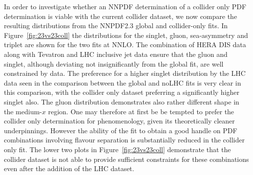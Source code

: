 In order to investigate whether an NNPDF determination of a collider only PDF determination is viable with the current collider dataset, we now compare the resulting distributions from the NNPDF2.3 global and collider-only fits. In Figure~\ref{fig:23vs23coll} the distributions for the singlet, gluon, sea-asymmetry and triplet are shown for the two fits at NNLO. The combination of HERA DIS data along with Tevatron and LHC inclusive jet data ensure that the gluon and singlet, although deviating not insignificantly from the global fit, are well constrained by data. The preference for a higher singlet distribution by the LHC data seen in the comparison between the global and noLHC fits is very clear in this comparison, with the collider only dataset preferring a significantly higher singlet also. The gluon distribution demonstrates also rather different shape in the medium-$x$ region. One may therefore at first be be tempted to prefer the collider only determination for phenomenology, given its theoretically cleaner underpinnings. However the ability of the fit to obtain a good handle on PDF combinations involving flavour separation is substantially reduced in the collider only fit. The lower two plots in Figure~\ref{fig:23vs23coll} demonstrate that the collider dataset is not able to provide sufficient constraints for these combinations even after the addition of the LHC dataset.


